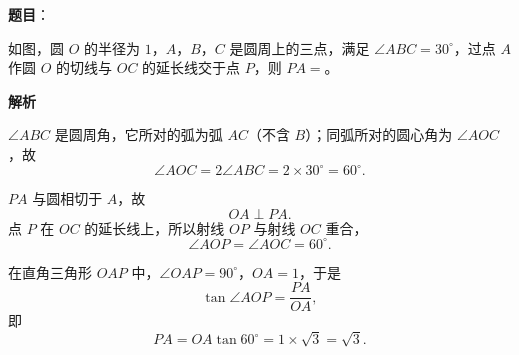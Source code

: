 \begin{answer}

\textbf{题目}：

如图，圆 $O$ 的半径为 $1$，$A$，$B$，$C$ 是圆周上的三点，满足 $\angle ABC=30^\circ$，过点 $A$ 作圆 $O$ 的切线与 $OC$ 的延长线交于点 $P$，则 $PA=$\gkblank{}。
\nopagebreak[4]
\begin{center}\end{center}
\nopagebreak[4]
\textbf{解析}

$\angle ABC$ 是圆周角，它所对的弧为弧 $AC$（不含 $B$）；同弧所对的圆心角为 $\angle AOC$，故
\nopagebreak[4]
\[\angle AOC=2\angle ABC=2\times30^\circ=60^\circ.\]

$PA$ 与圆相切于 $A$，故
\nopagebreak[4]
\[OA\perp PA.\]
点 $P$ 在 $OC$ 的延长线上，所以射线 $OP$ 与射线 $OC$ 重合，
\nopagebreak[4]
\[\angle AOP=\angle AOC=60^\circ.\]

在直角三角形 $OAP$ 中，$\angle OAP=90^\circ$，$OA=1$，于是
\nopagebreak[4]
\[\tan\angle AOP=\frac{PA}{OA},\]
即
\nopagebreak[4]
\[PA=OA\tan60^\circ=1\times\sqrt3=\sqrt3.\]


\end{answer}
